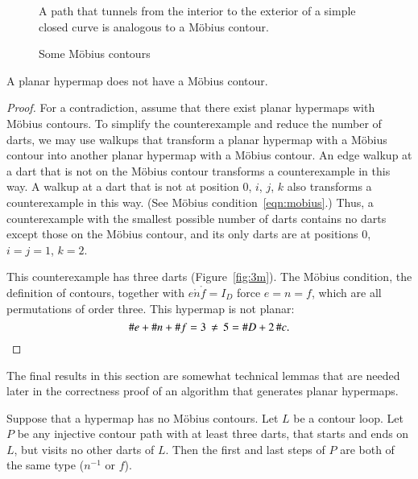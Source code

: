 \begin{figure}[htb]
\centering
{}
\caption{A path that tunnels from the interior to the exterior
of a simple closed curve
is analogous to a M\"obius contour.}
\label{fig:violate-jct}
\end{figure}

\begin{figure}[htb]
\centering
{}
\caption{Some M\"obius contours}
\label{fig:mobius-contour}
\end{figure}






\begin{lemma}\label{lemma:no-mobius}
A planar hypermap does not have a M\"obius contour.
\end{lemma}
%

\begin{proof} For a contradiction, assume that there exist planar
hypermaps with M\"obius contours.  To simplify the counterexample and
reduce the number of darts,
we may use walkups that transform a planar hypermap
with a M\"obius contour into another planar hypermap with a M\"obius contour.
An edge walkup
at a dart that is not on the M\"obius contour transforms a counterexample
in this way.
A walkup at a dart that is not at position $0$, $i$, $j$, $k$
also transforms a counterexample in this way.  (See M\"obius condition~\ref{eqn:mobius}.)
%
Thus, a counterexample with
the smallest possible number of darts contains no
darts except those on the M\"obius contour, and its only darts
are at positions $0$, $i=j=1$, $k=2$.

This counterexample has three darts (Figure~\ref{fig:3m}).  
The M\"obius condition, the
definition of contours, together with $e\ocirc n\ocirc f=I_D$ force
$e=n=f$, which are all permutations of order three.  This hypermap is not planar:
\[
\# e + \# n + \# f = 3\,\ne\, 5 = \# D + 2\,
\#c.\qedhere
\]
\end{proof}



The final results in this section are somewhat  technical lemmas that are
needed later in the correctness proof of an algorithm that generates planar hypermaps.

\begin{lemma}\label{lemma:contour-path-type}
Suppose that a hypermap has no M\"obius contours. Let $L$ be a
contour loop.  Let $P$ be any injective contour path with at least
three darts, that starts and ends on $L$, but visits no other darts of
$L$.  Then the first and last steps of $P$ are both of the same type
($n^{-1}$ or $f$).
\end{lemma}
%

